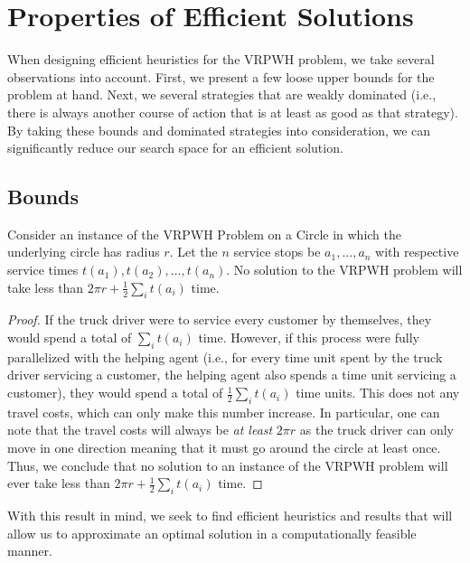 \documentclass[12pt]{scrartcl}
\begin{document}
\section{Properties of Efficient Solutions}
When designing efficient heuristics for the VRPWH problem, we take several observations into account. First, we present a few loose upper bounds for the problem at hand. Next, we several strategies that are weakly dominated (i.e., there is always another course of action that is at least as good as that strategy). \\

By taking these bounds and dominated strategies into consideration, we can significantly reduce our search space for an efficient solution. 

\subsection{Bounds}

\begin{proposition}
Consider an instance of the VRPWH Problem on a Circle in which the underlying circle has radius $r$. Let the $n$ service stops be $a_1, \ldots, a_n$ with respective service times $t(a_1), t(a_2), \ldots, t(a_n)$. No solution to the VRPWH problem will take less than $2\pi r + \frac{1}{2}\sum_{i} t(a_i)$ time.
\end{proposition}
\begin{proof}
If the truck driver were to service every customer by themselves, they would spend a total of $\sum_{i} t(a_i)$ time. However, if this process were fully parallelized with the helping agent (i.e., for every time unit spent by the truck driver servicing a customer, the helping agent also spends a time unit servicing a customer), they would spend a total of $\frac{1}{2} \sum_{i} t(a_i)$ time units. This does not any travel costs, which can only make this number increase. In particular, one can note that the travel costs will always be \textit{at least} $2\pi r$ as the truck driver can only move in one direction meaning that it must go around the circle at least once. Thus, we conclude that no solution to an instance of the VRPWH problem will ever take less than $2\pi r + \frac{1}{2}\sum_{i} t(a_i)$ time. 
\end{proof}

With this result in mind, we seek to find efficient heuristics and results that will allow us to approximate an optimal solution in a computationally feasible manner.
\end{document}
